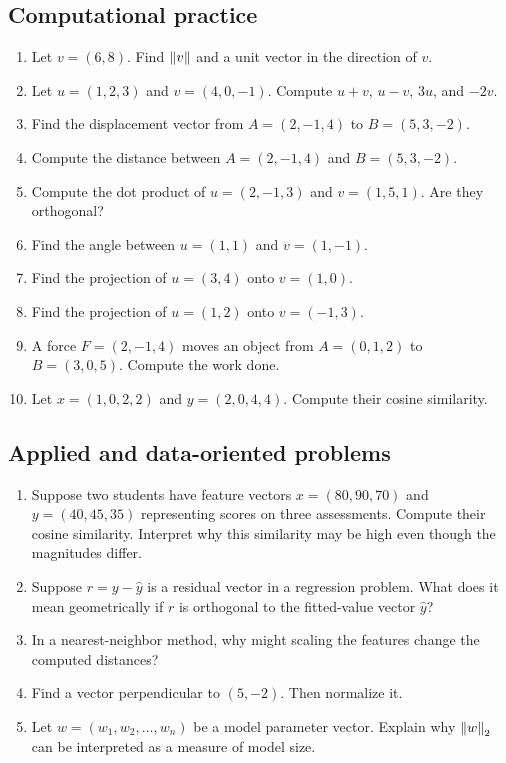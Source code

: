 \subsection*{Computational practice}

\begin{enumerate}
\item Let $v=(6,8)$. Find $\left\lVert v\right\rVert$ and a unit vector in the direction of $v$.
\item Let $u=(1,2,3)$ and $v=(4,0,-1)$. Compute $u+v$, $u-v$, $3u$, and $-2v$.
\item Find the displacement vector from $A=(2,-1,4)$ to $B=(5,3,-2)$.
\item Compute the distance between $A=(2,-1,4)$ and $B=(5,3,-2)$.
\item Compute the dot product of $u=(2,-1,3)$ and $v=(1,5,1)$. Are they orthogonal?
\item Find the angle between $u=(1,1)$ and $v=(1,-1)$.
\item Find the projection of $u=(3,4)$ onto $v=(1,0)$.
\item Find the projection of $u=(1,2)$ onto $v=(-1,3)$.
\item A force $F=(2,-1,4)$ moves an object from $A=(0,1,2)$ to $B=(3,0,5)$. Compute the work done.
\item Let $x=(1,0,2,2)$ and $y=(2,0,4,4)$. Compute their cosine similarity.
\end{enumerate}

\subsection*{Applied and data-oriented problems}

\begin{enumerate}
\item Suppose two students have feature vectors $x=(80,90,70)$ and $y=(40,45,35)$ representing scores on three assessments. Compute their cosine similarity. Interpret why this similarity may be high even though the magnitudes differ.
\item Suppose $r=y-\widehat y$ is a residual vector in a regression problem. What does it mean geometrically if $r$ is orthogonal to the fitted-value vector $\widehat y$?
\item In a nearest-neighbor method, why might scaling the features change the computed distances?
\item Find a vector perpendicular to $(5,-2)$. Then normalize it.
\item Let $w=(w_1,w_2,\ldots,w_n)$ be a model parameter vector. Explain why $\left\lVert w\right\rVert_2$ can be interpreted as a measure of model size.
\end{enumerate}

